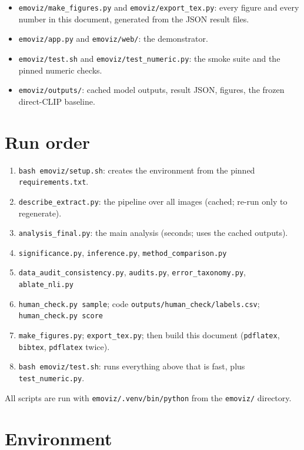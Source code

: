 \begin{sloppypar}
\begin{itemize}
\item \texttt{emoviz/make\_figures.py} and \texttt{emoviz/export\_tex.py}: every figure and every number in this document, generated from the JSON result files.
\item \texttt{emoviz/app.py} and \texttt{emoviz/web/}: the demonstrator.
\item \texttt{emoviz/test.sh} and \texttt{emoviz/test\_numeric.py}: the smoke suite and the pinned numeric checks.
\item \texttt{emoviz/outputs/}: cached model outputs, result JSON, figures, the frozen direct-CLIP baseline.
\end{itemize}

\section{Run order}
\begin{enumerate}\setlength{\itemsep}{1pt}
\item \texttt{bash emoviz/setup.sh}: creates the environment from the pinned \texttt{requirements.txt}.
\item \texttt{describe\_extract.py}: the pipeline over all images (cached; re-run only to regenerate).
\item \texttt{analysis\_final.py}: the main analysis (seconds; uses the cached outputs).
\item \texttt{significance.py}, \texttt{inference.py}, \texttt{method\_comparison.py}
\item \texttt{data\_audit\_consistency.py}, \texttt{audits.py}, \texttt{error\_taxonomy.py}, \texttt{ablate\_nli.py}
\item \texttt{human\_check.py sample}; code \texttt{outputs/human\_check/labels.csv}; \texttt{human\_check.py score}
\item \texttt{make\_figures.py}; \texttt{export\_tex.py}; then build this document (\texttt{pdflatex}, \texttt{bibtex}, \texttt{pdflatex} twice).
\item \texttt{bash emoviz/test.sh}: runs everything above that is fast, plus \texttt{test\_numeric.py}.
\end{enumerate}
All scripts are run with \texttt{emoviz/.venv/bin/python} from the \texttt{emoviz/} directory.

\section{Environment}

\end{sloppypar}
